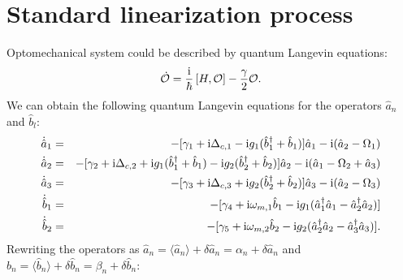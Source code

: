 \documentclass{article}
\begin{document}
\section{Standard linearization process}
Optomechanical system could be described by quantum Langevin equations:
\begin{equation}
\dot{\mathcal{O}}=\frac{{\rm i}}{\hbar}\left[H,\mathcal{O}\right]-\frac{\gamma}{2}\mathcal{O}.
\end{equation}
We can obtain the following quantum Langevin equations for the operators $\hat a_n$ and $\hat b_l$:
\begin{eqnarray}\label{eq4}
\dot{\hat a}_1 &=& -[\gamma_1+{\rm i}\Delta_{c,1}-{\rm i}g_1(\hat b_1^{\dag}+\hat b_1)]\hat a_1-{\rm i}(\hat a_2-\Omega_1)\nonumber\\
\dot{\hat a}_2 &=& -[\gamma_2+{\rm i}\Delta_{c,2}+{\rm i}g_1(\hat b_1^{\dag}+\hat b_1)-{\rm i}g_2(\hat b_2^{\dag}+\hat b_2)]\hat a_2-{\rm i}(\hat a_1-\Omega_2+\hat a_3)\nonumber\\
\dot{\hat a}_3 &=& -[\gamma_3+{\rm i}\Delta_{c,3}+{\rm i}g_2(\hat b_2^{\dag}+\hat b_2)]\hat a_3-{\rm i}(\hat a_2-\Omega_3)\nonumber\\
\dot{\hat b}_1 &=& -[\gamma_4+{\rm i}\omega_{m,1}\hat b_1-{\rm i}g_1(\hat a_1^{\dag}\hat a_1-\hat a_2^{\dag}\hat a_2)] \nonumber\\
\dot{\hat b}_2 &=& -[\gamma_5+{\rm i}\omega_{m,2}\hat b_2-{\rm i}g_2(\hat a_2^{\dag}\hat a_2-\hat a_3^{\dag}\hat a_3)] .
\end{eqnarray}
Rewriting the operators as $\hat a_n= \langle \hat a_n \rangle +\delta \hat a_n = \alpha_n +\delta \hat a_n$ and $\hat b_n= \langle \hat b_n \rangle +\delta \hat b_n = \beta_n +\delta \hat b_n$:
\end{document}
